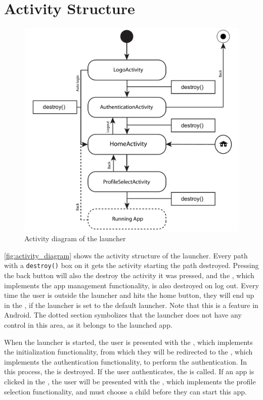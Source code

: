 \section{Activity Structure}
\label{implementation:activity_structure}
\begin{figure}[h!]
	\centering
	\includegraphics[width=1\textwidth]{gfx/activityDiagram.pdf}
	\caption{Activity diagram of the launcher}
	\label{fig:activity_diagram}
\end{figure}

\autoref{fig:activity_diagram} shows the activity structure of the \giraf[] launcher. 
Every path with a \verb+destroy()+ box on it gets the activity starting the path destroyed.
Pressing the back button will also the destroy the activity it was pressed, and the , which implements the app management functionality, is also destroyed on log out.
Every time the user is outside the launcher and hits the home button, they will end up in the , if the \giraf[] launcher is set to the default launcher.
Note that this is a feature in Android. 
The dotted section symbolizes that the launcher does not have any control in this area, as it belongs to the launched app.

When the launcher is started, the user is presented with the , which implements the initialization functionality, from which they will be redirected to the , which implements the authentication functionality, to perform the authentication. 
In this process, the  is destroyed.
If the user authenticates, the  is called. 
If an app is clicked in the , the user will be presented with the , which implements the profile selection functionality, and must choose a child before they can start this app.